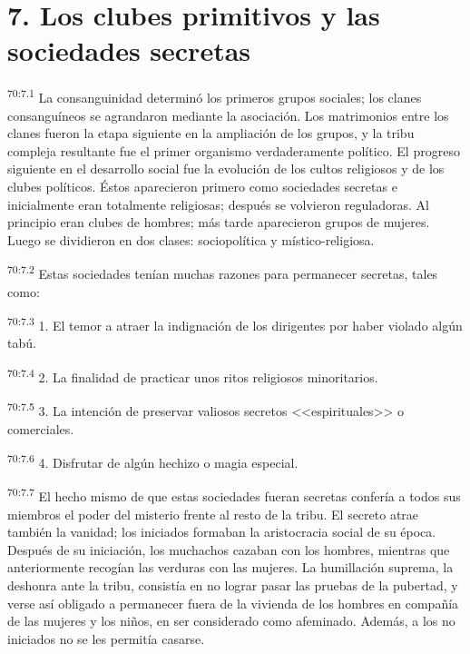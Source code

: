 \documentclass[twoside, 11pt]{book}
\begin{document}
\section*{7. Los clubes primitivos y las sociedades secretas}
\par
\textsuperscript{70:7.1} La consanguinidad determinó los primeros grupos sociales; los clanes consanguíneos se agrandaron mediante la asociación. Los matrimonios entre los clanes fueron la etapa siguiente en la ampliación de los grupos, y la tribu compleja resultante fue el primer organismo verdaderamente político. El progreso siguiente en el desarrollo social fue la evolución de los cultos religiosos y de los clubes políticos. Éstos aparecieron primero como sociedades secretas e inicialmente eran totalmente religiosas; después se volvieron reguladoras. Al principio eran clubes de hombres; más tarde aparecieron grupos de mujeres. Luego se dividieron en dos clases: sociopolítica y místico-religiosa.

\par
\textsuperscript{70:7.2} Estas sociedades tenían muchas razones para permanecer secretas, tales como:

\par
\textsuperscript{70:7.3} 1. El temor a atraer la indignación de los dirigentes por haber violado algún tabú.

\par
\textsuperscript{70:7.4} 2. La finalidad de practicar unos ritos religiosos minoritarios.

\par
\textsuperscript{70:7.5} 3. La intención de preservar valiosos secretos <<espirituales>> o comerciales.

\par
\textsuperscript{70:7.6} 4. Disfrutar de algún hechizo o magia especial.

\par
\textsuperscript{70:7.7} El hecho mismo de que estas sociedades fueran secretas confería a todos sus miembros el poder del misterio frente al resto de la tribu. El secreto atrae también la vanidad; los iniciados formaban la aristocracia social de su época. Después de su iniciación, los muchachos cazaban con los hombres, mientras que anteriormente recogían las verduras con las mujeres. La humillación suprema, la deshonra ante la tribu, consistía en no lograr pasar las pruebas de la pubertad, y verse así obligado a permanecer fuera de la vivienda de los hombres en compañía de las mujeres y los niños, en ser considerado como afeminado. Además, a los no iniciados no se les permitía casarse.
\end{document}
